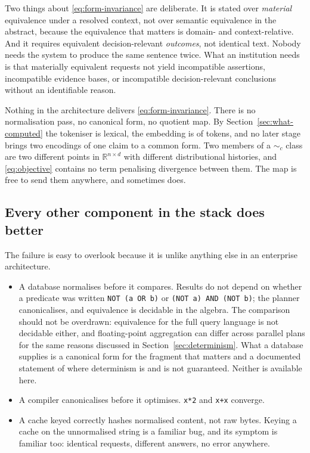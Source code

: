 Two things about \eqref{eq:form-invariance} are deliberate. It is stated over
\emph{material} equivalence under a resolved context, not over semantic
equivalence in the abstract, because the equivalence that matters is domain- and
context-relative. And it requires equivalent decision-relevant \emph{outcomes},
not identical text. Nobody needs the system to produce the same sentence twice.
What an institution needs is that materially equivalent requests not yield
incompatible assertions, incompatible evidence bases, or incompatible
decision-relevant conclusions without an identifiable reason.

Nothing in the architecture delivers \eqref{eq:form-invariance}. There is no
normalisation pass, no canonical form, no quotient map. By
Section~\ref{sec:what-computed} the tokeniser is lexical, the embedding is of
tokens, and no later stage brings two encodings of one claim to a common form. Two
members of a $\sim_c$ class are two different points in $\mathbb{R}^{n \times d}$
with different distributional histories, and \eqref{eq:objective} contains no term
penalising divergence between them. The map is free to send them anywhere, and
sometimes does.

\subsection{Every other component in the stack does better}

The failure is easy to overlook because it is unlike anything else in an enterprise
architecture.

\begin{itemize}
  \item A database normalises before it compares. Results do not depend on whether
        a predicate was written \texttt{NOT (a OR b)} or \texttt{(NOT a) AND (NOT
        b)}; the planner canonicalises, and equivalence is decidable in the
        algebra. The comparison should not be overdrawn: equivalence for the full
        query language is not decidable either, and floating-point aggregation can
        differ across parallel plans for the same reasons discussed in
        Section~\ref{sec:determinism}. What a database supplies is a canonical form
        for the fragment that matters and a documented statement of where determinism
        is and is not guaranteed. Neither is available here.
  \item A compiler canonicalises before it optimises. \texttt{x*2} and
        \texttt{x+x} converge.
  \item A cache keyed correctly hashes normalised content, not raw bytes. Keying a
        cache on the unnormalised string is a familiar bug, and its symptom is
        familiar too: identical requests, different answers, no error anywhere.
\end{itemize}


